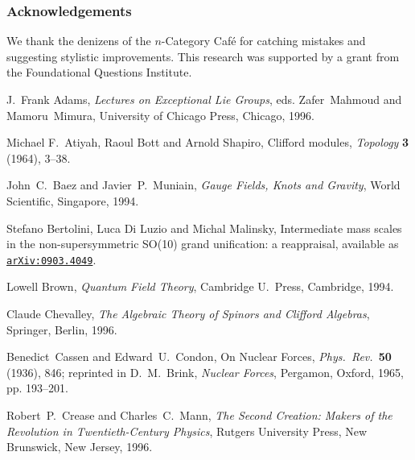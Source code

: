 \documentclass{article}
\begin{document}
\subsubsection*{Acknowledgements}

We thank the denizens of the $n$-Category Caf\'e for catching mistakes
and suggesting stylistic improvements.  This research was supported by
a grant from the Foundational Questions Institute.

\begin{thebibliography}{99}

J.\ Frank Adams, {\em {Lectures on Exceptional Lie Groups}},  eds. Zafer\ Mahmoud
and Mamoru\ Mimura, University of Chicago Press, Chicago, 1996.

Michael F.\ Atiyah, Raoul Bott and Arnold Shapiro, Clifford modules,
{\em Topology} {\bf 3} (1964), 3--38. 

John\ C.\ Baez and Javier\ P.\ Muniain, {\em {Gauge Fields, Knots and
Gravity}}, World Scientific, Singapore, 1994.

Stefano Bertolini, Luca Di Luzio and Michal Malinsky, 
Intermediate mass scales in the non-supersymmetric SO(10) grand 
unification: a reappraisal, available as
\href{http://arxiv.org/abs/hep-ph/0903.4049}
{\texttt{arXiv:0903.4049}}. 

Lowell Brown, {\em {Quantum Field Theory}}, Cambridge U.\ Press, Cambridge,
1994.  

 Claude Chevalley, {\em {The Algebraic Theory of
Spinors and Clifford Algebras}}, Springer, Berlin, 1996.

Benedict\ Cassen and Edward\ U.\ Condon, On Nuclear Forces, 
{\em {Phys.\ Rev.\ }}{\bf 50} (1936), 846; reprinted in 
D.\ M.\ Brink, {\em {Nuclear Forces}}, Pergamon, Oxford, 1965, pp. 193--201.

Robert\ P.\ Crease and Charles\ C.\ Mann, {\em {The Second Creation: Makers of
the Revolution in Twentieth-Century Physics}}, Rutgers University Press, New
Brunswick, New Jersey, 1996.


\end{thebibliography}
\end{document}
